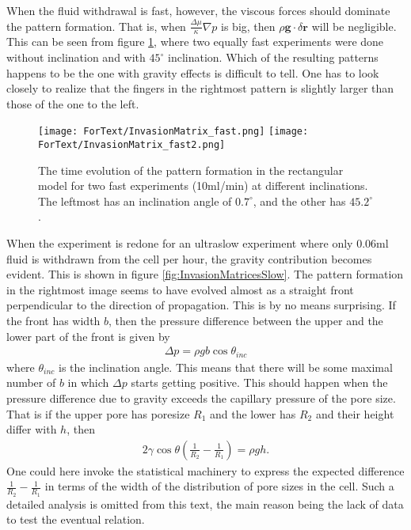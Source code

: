 \documentclass[twoside,utf8]{article}
\newcommand{\EQU}[1] { \begin{equation*} \begin{split} #1 \end{split} \end{equation*} }
\begin{document}
When the fluid withdrawal is fast, however, the viscous forces should dominate the pattern formation. That is, when $\frac{\Delta\mu}{\kappa}\nabla p$ is big, then $\rho \mathbf{g} \cdot \delta \mathbf{r}$ will be negligible. This can be seen from figure \ref{fig:InvasionMatricesFast}, where two equally fast experiments were done without inclination and with $45^\circ$ inclination. Which of the resulting patterns happens to be the one with gravity effects is difficult to tell. One has to look closely to realize that the fingers in the rightmost pattern is slightly larger than those of the one to the left.

\begin{figure}[H]
	\begin{center}
\texttt{[image: ForText/InvasionMatrix\_fast.png]}
\texttt{[image: ForText/InvasionMatrix\_fast2.png]}
	\end{center}
	\caption{The time evolution of the pattern formation in the rectangular model for two fast experiments (10ml/min) at different inclinations. The leftmost has an inclination angle of $0.7^\circ$, and the other has $45.2^\circ$. }
	\label{fig:InvasionMatricesFast}
\end{figure}

\noindent
When the experiment is redone for an ultraslow experiment where only $0.06$ml fluid is withdrawn from the cell per hour, the gravity contribution becomes evident. This is shown in figure \ref{fig:InvasionMatricesSlow}. The pattern formation in the rightmost image seems to have evolved almost as a straight front perpendicular to the direction of propagation. This is by no means surprising. If the front has width $b$, then the pressure difference between the upper and the lower part of the front is given by
\EQU{
\Delta p = \rho gb \cos \theta_{inc}
}
where $\theta_{inc}$ is the inclination angle. This means that there will be some maximal number of $b$ in which $\Delta p$ starts getting positive. This should happen when the pressure difference due to gravity exceeds the capillary pressure of the pore size. That is if the upper pore has poresize $R_1$ and the lower has $R_2$ and their height differ with $h$, then
\EQU{
2\gamma \cos \theta\left(\frac{1}{R_2}-\frac{1}{R_1}\right) = \rho g h.
}
One could here invoke the statistical machinery to express the expected difference $\frac{1}{R_2}-\frac{1}{R_1}$ in terms of the width of the distribution of pore sizes in the cell. Such a detailed analysis is omitted from this text, the main reason being the lack of data to test the eventual relation.
\end{document}
